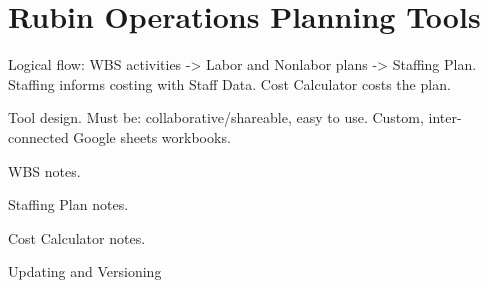 \section{Rubin Operations Planning Tools}
\label{sec:planning-tools}

Logical flow: WBS activities -> Labor and Nonlabor plans -> Staffing Plan. Staffing informs costing with Staff Data. Cost Calculator costs the plan.

Tool design. Must be: collaborative/shareable, easy to use. Custom, inter-connected Google sheets workbooks.

WBS notes.

Staffing Plan notes.

Cost Calculator notes.

Updating and Versioning

